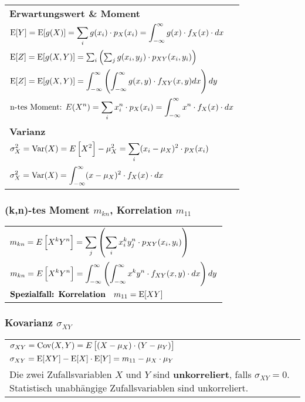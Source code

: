 \documentclass[a4paper]{article}
\begin{document}
\begin{twocolumn}
\begin{tabularx}{\columnwidth}{Y}
\textbf{Erwartungswert \& Moment} \\
$\displaystyle \operatorname{E}[Y] = \operatorname{E}[g(X)] = \sum_{i} g(x_i) \cdot p_X(x_i) = \int_{-\infty}^\infty g(x) \cdot
f_X(x) \cdot dx$ \\
$ \operatorname{E}[Z] = \operatorname{E}[g(X,Y)] = \sum_i \left( \sum_j g(x_i,y_j) \cdot p_{XY}(x_i,y_i) \right)$  \\
$ \displaystyle \operatorname{E}[Z] = \operatorname{E}[g(X,Y)] = 
\int_{-\infty}^\infty \left( \int_{-\infty}^\infty g(x,y) \cdot f_{XY}(x,y) dx \right) dy$
\\ 
$ \displaystyle \text{n-tes Moment: } E(X^n) = \sum_i x_i^n \cdot p_X(x_i) =
\int_{-\infty}^{\infty} x^n \cdot f_X(x) \cdot dx$ \\
\textbf{Varianz} \\
$\displaystyle \sigma_X^2 = \operatorname{Var}(X) = E \left[ X^2 \right] - \mu_X^2 = \sum_i(x_i - \mu_X)^2 \cdot p_X(x_i)$ \\
$\displaystyle \sigma_X^2 = \operatorname{Var}(X) = \int_{-\infty}^{\infty} (x-\mu_X)^2 \cdot f_X(x) \cdot dx$ \\
\end{tabularx}

\subsubsection{(k,n)-tes Moment $m_{kn}$, Korrelation $m_{11}$}
\begin{tabularx}{\columnwidth}{Y}
  $\displaystyle m_{kn} = E \left[ X^k Y^n \right] = \sum_j \left( \sum_i x_i^k y_j^n \cdot
  p_{XY}(x_i,y_i)\right)$ \\
  $\displaystyle m_{kn} = E\left[X^k Y^n\right] = \int_{-\infty}^\infty \left(
  \int_{-\infty}^\infty x^k y^n \cdot f_{XY}(x,y) \cdot dx \right) dy$ \\
  $\displaystyle \textbf{Spezialfall: Korrelation} \quad m_{11} = \operatorname{E}[XY] $
\end{tabularx}

\subsubsection{Kovarianz $\sigma_{XY}$}
\begin{tabularx}{\columnwidth}{Y}
  $\displaystyle \sigma_{XY} = \operatorname{Cov}(X,Y) = E\left[ (X-\mu_X) \cdot (Y-\mu_Y) \right] $ \\
  $\displaystyle \sigma_{XY} = \operatorname{E}[XY] - \operatorname{E}[X] \cdot \operatorname{E}[Y] = m_{11} - \mu_X \cdot \mu_Y$ \\
  Die zwei Zufallsvariablen $X$ und $Y$ sind \textbf{unkorreliert}, falls $\sigma_{XY} =
  0$. Statistisch unabhängige Zufallsvariablen sind unkorreliert.
\end{tabularx}


\end{twocolumn}
\end{document}
